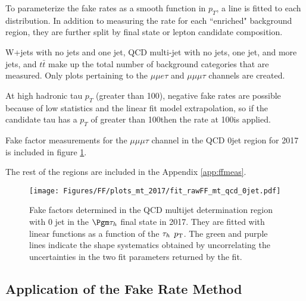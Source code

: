 To parameterize the fake rates as a smooth function in $p_T$, a line is fitted to each distribution. 
In addition to measuring the rate for each ``enriched" background region, they are further split by final state or lepton candidate composition. 

W+jets with no jets and one jet, QCD multi-jet with no jets, one jet, and more jets, and $t\bar{t}$ make up the total number of background categories that are measured. Only plots pertaining to the $\mu\mu e \tau$ and $\mu\mu \mu \tau$ channels are created. 

At high hadronic tau $p_T$ (greater than 100\GeV), negative fake rates are possible because of low statistics and the linear fit model extrapolation, so if the candidate tau has a $p_T$ of greater than 100\GeV then the rate at 100\GeV is applied. 

Fake factor measurements for the $\mu\mu\mu\tau$ channel in the QCD 0jet region for 2017 is included in figure \ref{fig:fit_raw_mt_0jet_qcd}. 

The rest of the regions are included in the Appendix \ref{app:ffmeas}.




\begin{figure}[ht!b]
\centering
\texttt{[image: Figures/FF/plots\_mt\_2017/fit\_rawFF\_mt\_qcd\_0jet.pdf]}\\
\caption{\label{fig:fit_raw_mt_0jet_qcd} Fake factors determined in the QCD multijet determination region with 0 jet in the $\Pgm\tauh$ final state in 2017. They are fitted with linear functions as a function of the $\tau_h$ $p_{\mathrm{T}}$. The green and purple lines indicate the shape systematics obtained by uncorrelating the uncertainties in the two fit parameters returned by the fit.  }
\end{figure}





\clearpage

\subsection{Application of the Fake Rate Method}

